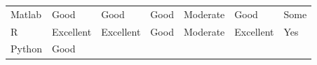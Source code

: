 \documentclass[]{book}
\begin{document}
\begin{longtable}[]{@{}lllllll@{}}
\begin{minipage}[t]{0.08\columnwidth}\raggedright
Matlab\strut
\end{minipage} & \begin{minipage}[t]{0.10\columnwidth}\raggedright
Good\strut
\end{minipage} & \begin{minipage}[t]{0.13\columnwidth}\raggedright
Good\strut
\end{minipage} & \begin{minipage}[t]{0.16\columnwidth}\raggedright
Good\strut
\end{minipage} & \begin{minipage}[t]{0.11\columnwidth}\raggedright
Moderate\strut
\end{minipage} & \begin{minipage}[t]{0.17\columnwidth}\raggedright
Good\strut
\end{minipage} & \begin{minipage}[t]{0.05\columnwidth}\raggedright
Some\strut
\end{minipage}\tabularnewline
\begin{minipage}[t]{0.08\columnwidth}\raggedright
R\strut
\end{minipage} & \begin{minipage}[t]{0.10\columnwidth}\raggedright
Excellent\strut
\end{minipage} & \begin{minipage}[t]{0.13\columnwidth}\raggedright
Excellent\strut
\end{minipage} & \begin{minipage}[t]{0.16\columnwidth}\raggedright
Good\strut
\end{minipage} & \begin{minipage}[t]{0.11\columnwidth}\raggedright
Moderate\strut
\end{minipage} & \begin{minipage}[t]{0.17\columnwidth}\raggedright
Excellent\strut
\end{minipage} & \begin{minipage}[t]{0.05\columnwidth}\raggedright
Yes\strut
\end{minipage}\tabularnewline
\begin{minipage}[t]{0.08\columnwidth}\raggedright
Python\strut
\end{minipage} & \begin{minipage}[t]{0.10\columnwidth}\raggedright
Good\strut
\end{minipage} & \begin{minipage}[t]{0.13\columnwidth}\raggedright

\end{minipage}
\end{longtable}
\end{document}
